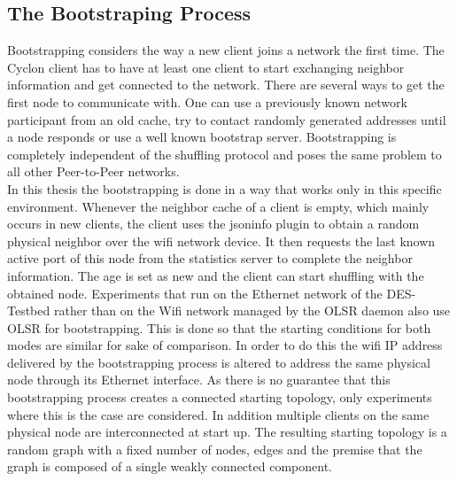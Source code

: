 \subsection{The Bootstraping Process}
Bootstrapping considers the way a new client joins a network the first time. The
Cyclon client has to have at least one client to start exchanging neighbor
information and get connected to the network. There are several ways to get the
first node to communicate with. One can use a previously known network
participant from an old cache, try to contact randomly generated addresses until
a node responds or use a well known bootstrap server. Bootstrapping is
completely independent of the shuffling protocol and poses the same problem to
all other Peer-to-Peer networks.\\
In this thesis the bootstrapping is done in a
way that works only in this specific environment. Whenever the neighbor cache of
a client is empty, which mainly occurs in new clients, the client uses the
jsoninfo plugin to obtain a random physical neighbor over the wifi network
device. It then requests the last known active port of this node from the
statistics server to complete the neighbor information. The age is set as new and the client can
start shuffling with the obtained node. Experiments that run on the
Ethernet network of the DES-Testbed rather than on the Wifi network managed
by the OLSR daemon also use OLSR for bootstrapping. This is done so that
the starting conditions for both modes are similar for sake of comparison. In
order to do this the wifi IP address delivered by the bootstrapping process is
altered to address the same physical node through its Ethernet interface. As
there is no guarantee that this bootstrapping process creates a connected
starting topology, only experiments where this is the case are considered. In
addition multiple clients on the same physical node are interconnected at
start up. The resulting starting topology is a random graph with a fixed number
of nodes, edges and the premise that the graph is composed of a single weakly
connected component. 

